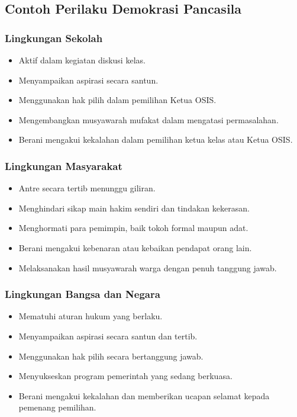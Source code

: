 \subsection{Contoh Perilaku Demokrasi Pancasila}

\subsubsection{Lingkungan Sekolah}
\begin{itemize}
\item Aktif dalam kegiatan diskusi kelas.
\item Menyampaikan aspirasi secara santun.
\item Menggunakan hak pilih dalam pemilihan Ketua OSIS.
\item Mengembangkan musyawarah mufakat dalam mengatasi permasalahan.
\item Berani mengakui kekalahan dalam pemilihan ketua kelas atau Ketua OSIS.
\end{itemize}

\subsubsection{Lingkungan Masyarakat}
\begin{itemize}
\item Antre secara tertib menunggu giliran.
\item Menghindari sikap main hakim sendiri dan tindakan kekerasan.
\item Menghormati para pemimpin, baik tokoh formal maupun adat.
\item Berani mengakui kebenaran atau kebaikan pendapat orang lain.
\item Melaksanakan hasil musyawarah warga dengan penuh tanggung jawab.
\end{itemize}

\subsubsection{Lingkungan Bangsa dan Negara}
\begin{itemize}
\item Mematuhi aturan hukum yang berlaku.
\item Menyampaikan aspirasi secara santun dan tertib.
\item Menggunakan hak pilih secara bertanggung jawab.
\item Menyukseskan program pemerintah yang sedang berkuasa.
\item Berani mengakui kekalahan dan memberikan ucapan selamat kepada pemenang pemilihan.
\end{itemize}

